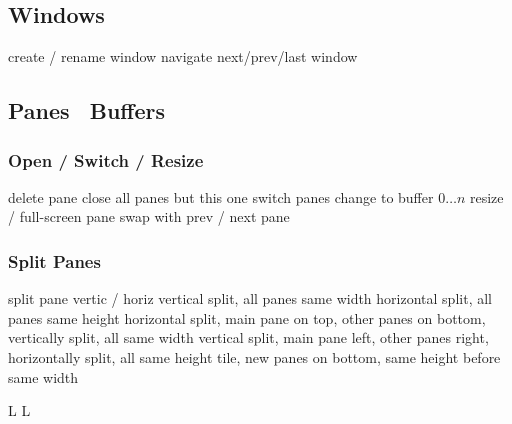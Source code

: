 \subsection{Windows}{}
	{create / rename window}
	{navigate next/prev/last window}

\subsection{Panes \or\ Buffers}{}
\subsubsection{Open / Switch / Resize}{}
	{delete pane}
	{close all panes but this one}
	{switch panes}
	{change to buffer $0 \ldots n$}
	{resize / full-screen pane}
	{swap with prev / next pane}

\subsubsection{Split Panes}{}
	{split pane vertic / horiz}
	{vertical split, all panes same width}
	{horizontal split, all panes same height}
	{horizontal split, main pane on top, other panes on bottom, vertically split, all same width}
	{vertical split, main pane left, other panes right, horizontally split, all same height}
	{tile, new panes on bottom, same height before same width}

\copyrightnotice

\supereject
\if L\lr \else\null\vfill\eject\fi
\if L\lr \else\null\vfill\eject\fi
\bye

